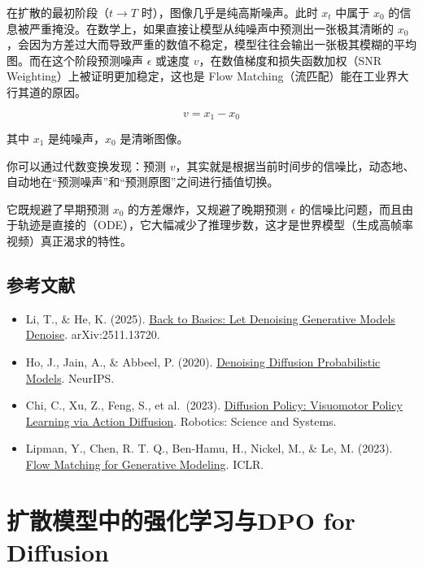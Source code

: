 在扩散的最初阶段（\(t\to T\) 时），图像几乎是纯高斯噪声。此时 \(x_t\) 中属于 \(x_0\) 的信息被严重掩没。在数学上，如果直接让模型从纯噪声中预测出一张极其清晰的 \(x_0\)，会因为方差过大而导致严重的数值不稳定，模型往往会输出一张极其模糊的平均图。而在这个阶段预测噪声 \(\epsilon\) 或速度 \(v\)，在数值梯度和损失函数加权（SNR Weighting）上被证明更加稳定，这也是 Flow Matching（流匹配）能在工业界大行其道的原因。

\[
v=x_1-x_0
\]

其中 \(x_1\) 是纯噪声，\(x_0\) 是清晰图像。

你可以通过代数变换发现：预测 \(v\)，其实就是根据当前时间步的信噪比，动态地、自动地在``预测噪声''和``预测原图''之间进行插值切换。

它既规避了早期预测 \(x_0\) 的方差爆炸，又规避了晚期预测 \(\epsilon\) 的信噪比问题，而且由于轨迹是直接的（ODE），它大幅减少了推理步数，这才是世界模型（生成高帧率视频）真正渴求的特性。

\hypertarget{ux53c2ux8003ux6587ux732e-133}{%
\subsection{参考文献}\label{ux53c2ux8003ux6587ux732e-133}}

\vspace{0.25em}
\begin{itemize}
\tightlist
\item
  Li, T., \& He, K. (2025). \href{https://arxiv.org/abs/2511.13720}{Back to Basics: Let Denoising Generative Models Denoise}. arXiv:2511.13720.
\item
  Ho, J., Jain, A., \& Abbeel, P. (2020). \href{https://arxiv.org/abs/2006.11239}{Denoising Diffusion Probabilistic Models}. NeurIPS.
\item
  Chi, C., Xu, Z., Feng, S., et al.~(2023). \href{https://arxiv.org/abs/2303.04137}{Diffusion Policy: Visuomotor Policy Learning via Action Diffusion}. Robotics: Science and Systems.
\item
  Lipman, Y., Chen, R. T. Q., Ben-Hamu, H., Nickel, M., \& Le, M. (2023). \href{https://arxiv.org/abs/2210.02747}{Flow Matching for Generative Modeling}. ICLR.
\end{itemize}

\clearpage

\hypertarget{ux6269ux6563ux6a21ux578bux4e2dux7684ux5f3aux5316ux5b66ux4e60ux4e0edpo-for-diffusion}{%
\section{扩散模型中的强化学习与DPO for Diffusion}\label{ux6269ux6563ux6a21ux578bux4e2dux7684ux5f3aux5316ux5b66ux4e60ux4e0edpo-for-diffusion}}

